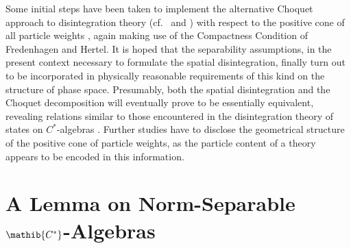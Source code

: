 \documentclass[a4paper,a4paper]{article}
\numberwithin{equation}{section}
\theoremstyle{definition}
\theoremstyle{plain}
\theoremstyle{remark}
\theoremstyle{assumption}
\begin{document}
  Some initial steps have been taken to implement the alternative
  Choquet approach to disintegration theory (cf.~\cite{alfsen:1971}
  and \cite{phelps:1966}) with respect to the positive cone of all
  particle weights \cite{porrmann:2000}, again making use of the
  Compactness Condition of Fredenhagen and Hertel. It is hoped that
  the separability assumptions, in the present context necessary to
  formulate the spatial disintegration, finally turn out to be
  incorporated in physically reasonable requirements of this kind on
  the structure of phase space. Presumably, both the spatial
  disintegration and the Choquet decomposition will eventually prove
  to be essentially equivalent, revealing relations similar to those
  encountered in the disintegration theory of states on $C^*$-algebras
  \cite[Chapter~4]{bratteli/robinson:1987}. Further studies have to
  disclose the geometrical structure of the positive cone of particle
  weights, as the particle content of a theory appears to be encoded
  in this information.


\appendix


\section{A Lemma on Norm-Separable $\mathib{C^*}$-Algebras}
  \label{sec:separable-algebras}
  
\end{document}
